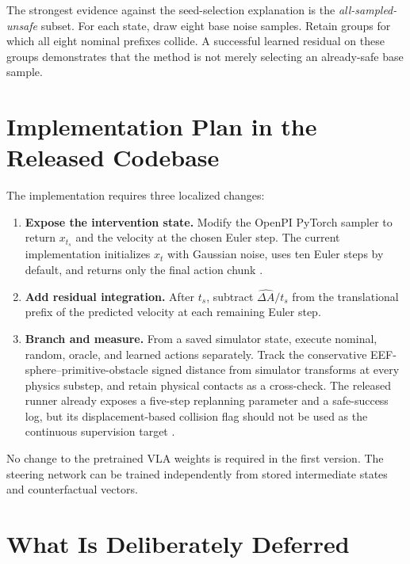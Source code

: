 \documentclass[10pt,conference]{IEEEtran}
\newcommand{\1}{\mathbf{1}}
\begin{document}
The strongest evidence against the seed-selection explanation is the \emph{all-sampled-unsafe} subset. For each state, draw eight base noise samples. Retain groups for which all eight nominal prefixes collide. A successful learned residual on these groups demonstrates that the method is not merely selecting an already-safe base sample.

\section{Implementation Plan in the Released Codebase}

The implementation requires three localized changes:
\begin{enumerate}[leftmargin=*,nosep]
    \item \textbf{Expose the intervention state.} Modify the OpenPI PyTorch sampler to return $x_{t_s}$ and the velocity at the chosen Euler step. The current implementation initializes $x_t$ with Gaussian noise, uses ten Euler steps by default, and returns only the final action chunk \cite{openpirepo,vlsarepo}.
    \item \textbf{Add residual integration.} After $t_s$, subtract $\widehat{\Delta A}/t_s$ from the translational prefix of the predicted velocity at each remaining Euler step.
    \item \textbf{Branch and measure.} From a saved simulator state, execute nominal, random, oracle, and learned actions separately. Track the conservative EEF-sphere--primitive-obstacle signed distance from simulator transforms at every physics substep, and retain physical contacts as a cross-check. The released runner already exposes a five-step replanning parameter and a safe-success log, but its displacement-based collision flag should not be used as the continuous supervision target \cite{vlsarepo}.
\end{enumerate}

No change to the pretrained VLA weights is required in the first version. The steering network can be trained independently from stored intermediate states and counterfactual vectors.

\section{What Is Deliberately Deferred}
\end{document}
